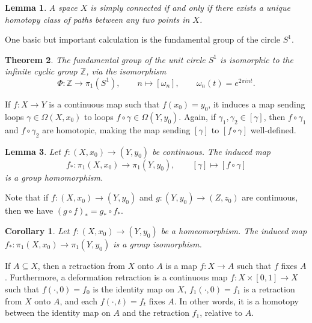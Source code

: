 \documentclass[12pt]{article}
\newcommand{\Z}{\mathbb{Z}}
\newtheorem{theorem}{Theorem}[section]
\newtheorem{corollary}{Corollary}[theorem]
\newtheorem{lemma}[theorem]{Lemma}
\theoremstyle{definition}
\theoremstyle{remark}
\begin{document}
    \begin{lemma}
        A space $X$ is simply connected if and only if there exists a unique homotopy
        class of paths between any two points in $X$.
    \end{lemma}

    One basic but important calculation is the fundamental group of the circle $S^1$.
    \\

    \begin{theorem}
        The fundamental group of the unit circle $S^1$ is isomorphic to the infinite
        cyclic group $\Z$, via the isomorphism \[
            \Phi\colon \Z \to \pi_1(S^1), \qquad
            n \mapsto [\omega_n], \qquad
            \omega_n(t) = e^{2\pi i nt}.
        \]
    \end{theorem}

    If $f\colon X \to Y$ is a continuous map such that $f(x_0) = y_0$, it induces a
    map sending loops $\gamma \in \Omega(X, x_0)$ to loops $f\circ
    \gamma \in \Omega(Y, y_0)$. Again, if $\gamma_1, \gamma_2 \in [\gamma]$, then
    $f\circ \gamma_1$ and $f\circ \gamma_2$ are homotopic, making the map sending
    $[\gamma]$ to $[f\circ \gamma]$ well-defined. \\

    \begin{lemma}
        Let $f\colon (X, x_0) \to (Y, y_0)$ be continuous. The induced map \[
            f_*\colon \pi_1(X, x_0) \to \pi_1(Y, y_0), \qquad
            [\gamma] \mapsto [f\circ \gamma]
        \] is a group homomorphism.
    \end{lemma}

    Note that if $f\colon (X, x_0) \to (Y, y_0)$ and $g\colon (Y, y_0) \to (Z, z_0)$
    are continuous, then we have $(g\circ f)_* = g_*\circ f_*$. \\

    \begin{corollary}
        Let $f\colon (X, x_0) \to (Y, y_0)$ be a homeomorphism. The induced map
        $f_*\colon \pi_1(X, x_0) \to \pi_1(Y, y_0)$ is a group isomorphism.
    \end{corollary}

    If $A \subseteq X$, then a retraction from $X$ onto $A$ is a map $f\colon X \to
    A$ such that $f$ fixes $A$. Furthermore, a deformation retraction is a continuous
    map $f\colon X \times [0, 1] \to X$ such that $f(\cdot, 0) = f_0$ is the identity
    map on $X$, $f_1(\cdot, 0) = f_1$ is a retraction from $X$ onto $A$, and each
    $f(\cdot, t) = f_t$ fixes $A$. In other words, it is a homotopy between the
    identity map on $A$ and the retraction $f_1$, relative to $A$. \\
\end{document}

